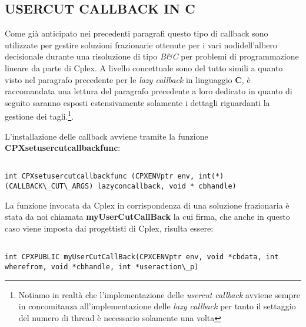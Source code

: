 \documentclass[11pt]{article}
\begin{document}
\subsection*{USERCUT CALLBACK IN C}
\label{sec:UserS}

Come già anticipato nei precedenti paragrafi questo tipo di callback sono utilizzate per gestire soluzioni frazionarie ottenute per i vari nodidell'albero decisionale durante una risoluzione di tipo \textit{B\&C} per problemi di programmazione lineare da parte di Cplex. A livello concettuale sono del tutto simili a quanto visto nel paragrafo precedente per le \textit{lazy callback} in linguaggio \textbf{C}, è raccomandata una lettura del paragrafo precedente a loro dedicato in quanto di seguito saranno esposti estensivamente solamente i dettagli riguardanti la gestione dei tagli.\footnote{Notiamo in realtà che l'implementazione delle \textit{usercut callback} avviene sempre in concomitanza all'implementazione delle \textit{lazy callback} per tanto il settaggio del numero di thread è necessario solamente una volta}.

L'installazione delle callback avviene tramite la funzione \textbf{CPXsetusercutcallbackfunc}:

\begin{lstlisting}

int CPXsetusercutcallbackfunc (CPXENVptr env, int(*)(CALLBACK\_CUT\_ARGS) lazyconcallback, void * cbhandle)

\end{lstlisting}

La funzione invocata da Cplex in corrispondenza di una soluzione frazionaria è stata da noi chiamata \textbf{myUserCutCallBack} la cui firma, che anche in questo caso viene imposta dai progettisti di Cplex, risulta essere:

\begin{lstlisting}

int CPXPUBLIC myUserCutCallBack(CPXCENVptr env, void *cbdata, int wherefrom, void *cbhandle, int *useraction\_p)

\end{lstlisting}
\end{document}
